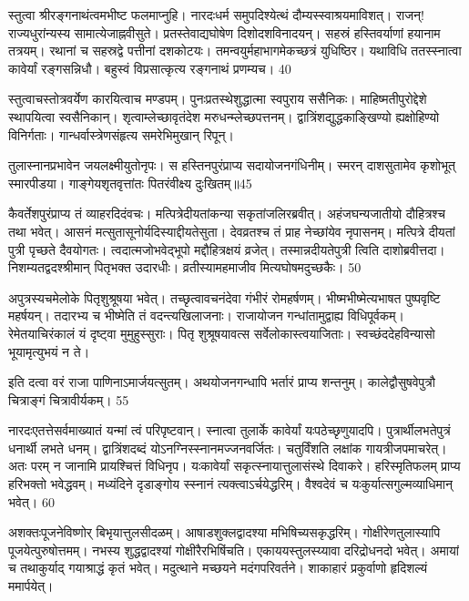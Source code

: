   स्तुत्वा श्रीरङ्गनाथंत्वमभीष्ट फलमाप्नुहि।
 नारदःधर्म समुपदिश्येत्थं दौम्यस्स्वाश्रयमाविशत्।
 राजन्! राज्यधुरांन्यस्य सामात्येजाह्नवीसुते।
 प्रतस्तेवाद्यघोषेण दिशोदशविनादयन्।
 सहस्रं हस्तिवर्याणां हयानाम तत्रयम्।
 रथानां च सहस्रद्वे पत्तीनां दशकोटयः।
 तमन्वयुर्महाभागमेकच्छत्रं युधिष्ठिर।
 यथाविधि ततस्स्नात्वा कावेर्यां रङ्गसन्निधौ।
 बहुस्वं विप्रसात्कृत्य रङ्गनाथं प्रणम्यच।
 40

  स्तुत्वाचस्तोत्रवर्येण कारयित्वाच मण्डपम्।
 पुनःप्रतस्थेशुद्धात्मा स्वपुराय ससैनिकः।
 माहिष्मतीपुरोद्देशे स्थापयित्वा स्वसैनिकान्।
 शृत्वाम्लेच्छावृतंदेश मरुधन्म्लेच्छपत्तनम्।
 द्वात्रिंशद्युद्धकाङ्खिण्यो ह्यक्षोहिण्यो विनिर्गताः।
 गान्धर्वास्त्रेणसंहृत्य समरेभिमुखान् रिपून्।
 
तुलास्नानप्रभावेन जयलक्ष्मीयुतोनृपः।
 स हस्तिनपुरंप्राप्य सदायोजनगंधिनीम्।
 स्मरन् दाशसुतामेव कृशोभूत् स्मारपीडया।
 गाङ्गेयशृतवृत्तांतः पितरंवीक्ष्य दुःखितम्॥45

  कैवर्तेशपुरंप्राप्य तं व्याहरदिदंवचः।
 मत्पित्रेदीयतांकन्या सकृतांजलिरब्रवीत्।
 अहंजघन्यजातीयो दौहित्रश्च तथा भवेत्।
 आसनं मत्सुतासूनोर्यदिस्याद्दीयतेसुता।
 देवव्रतश्च तं प्राह नेच्छांयेव नृपासनम्।
 मत्पित्रे दीयतां पुत्री पृच्छते दैवयोगतः।
 त्वदात्मजोभवेद्भूपो मद्दौहित्रक्षयं व्रजेत्।
 तस्मान्नदीयतेपुत्री त्विति दाशोब्रवीत्तदा।
 निशम्यतद्वदश्श्रीमान् पितृभक्त उदारधीः।
 व्रतीस्यामहमाजीव मित्यघोषमदुच्छकैः।
 50

  अपुत्रस्यचमेलोके पितृशुश्रूषया भवेत्।
 तच्छृत्वावचनंदेवा गंभीरं रोमहर्षणम्।
 भीष्मभीष्मेत्यभाषत पुष्पवृष्टि महर्षयन्।
 तदारभ्य च भीष्मेति तं वदन्त्यखिलाजनाः।
 राजायोजन गन्धांतामुद्वाह्य विधिपूर्वकम्।
 रेमेतयाचिरंकालं यं दृष्ट्वा मुमुहुस्सुराः।
 पितृ शुश्रूषयावत्स सर्वेलोकास्त्वयाजिताः।
 स्वच्छंददेहविन्यासो भूयामृत्युभयं न ते।
 
इति दत्वा वरं राजा पाणिनाऽमार्जयत्सुतम्।
 अथयोजनगन्धापि भर्तारं प्राप्य शन्तनुम्।
 कालेद्वौसुषवेपुत्रौ चित्राङ्गं चित्रावीर्यकम्।
 55

  नारदःएतत्तेसर्वमाख्यातं यन्मां त्वं परिपृष्टवान्।
 स्नात्वा तुलार्के कावेर्यां यःपठेच्छृणुयादपि।
 पुत्रार्थीलभतेपुत्रं धनार्थी लभते धनम्।
 द्वात्रिंशदब्दं योऽनग्निस्स्नानमज्जनवर्जितः।
 चतुर्विंशति लक्षांक गायत्रीजपमाचरेत्।
 अतः परम् न जानामि प्रायश्चित्तं विधिनृप।
 यःकावेर्यां सकृत्स्नायात्तुलासंस्थे दिवाकरे।
 हरिस्मृतिफलम् प्राप्य हरिभक्तो भवेद्धवम्।
 मध्यंदिने दृडाङ्गोय स्स्नानं त्यक्त्वाऽर्चयेद्धरिम्।
 वैश्वदेवं च यःकुर्यात्सगुल्मव्याधिमान् भवेत्।
 60

  अशक्तःपूजनेविष्णोर् बिभृयात्तुलसीदळम्।
 आषाडशुक्लद्वादश्या मभिषिच्यसकृद्धरिम्।
 गोक्षीरेणतुलास्यापि पूजयेत्पुरुषोत्तमम्।
 नभस्य शुद्धद्वादश्यां गोक्षीरैरभिषिंचति।
 एकाययस्तुलस्य्यावा दरिद्रोधनदो भवेत्।
 अमायां च तथाकुर्याद् गयाश्राद्धं कृतं भवेत्।
 मदुत्थाने मच्छयने मदंगपरिवर्तने।
 शाकाहारं प्रकुर्वाणो हृदिशल्यं ममार्पयेत्।
 
